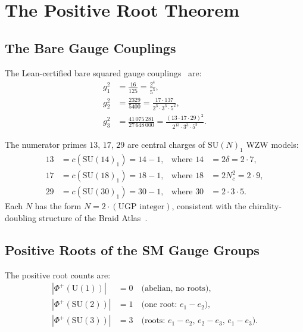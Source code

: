 \documentclass[11pt]{article}
\theoremstyle{remark}
\newcommand{\Nc}{N_c}
\newcommand{\ddelta}{\delta}
\newcommand{\PhiPlus}{\Phi^+}
\begin{document}
\section{The Positive Root Theorem}
\label{sec:posroots}

\subsection{The Bare Gauge Couplings}

The Lean-certified bare squared gauge couplings~\cite{Spivack2026_SM_UGP} are:
\begin{align}
  g_1^2 &= \tfrac{16}{125} = \tfrac{2^4}{5^3}, \label{eq:g1} \\[2pt]
  g_2^2 &= \tfrac{2329}{5400} = \tfrac{17 \cdot 137}{2^3 \cdot 3^3 \cdot 5^2}, \label{eq:g2} \\[2pt]
  g_3^2 &= \tfrac{41\,075\,281}{27\,648\,000}
         = \tfrac{(13 \cdot 17 \cdot 29)^2}{2^{13} \cdot 3^3 \cdot 5^3}. \label{eq:g3}
\end{align}

The numerator primes $13$, $17$, $29$ are central charges of $\mathrm{SU}(N)_1$ WZW models:
\begin{align*}
  13 &= c(\mathrm{SU}(14)_1) = 14 - 1, &\text{where } 14 &= 2\ddelta = 2 \cdot 7, \\
  17 &= c(\mathrm{SU}(18)_1) = 18 - 1, &\text{where } 18 &= 2\Nc^2 = 2 \cdot 9, \\
  29 &= c(\mathrm{SU}(30)_1) = 30 - 1, &\text{where } 30 &= 2 \cdot 3 \cdot 5.
\end{align*}
Each $N$ has the form $N = 2 \cdot (\text{UGP integer})$, consistent with the chirality-doubling
structure of the Braid Atlas~\cite{SpivackBraidAtlas}.

\subsection{Positive Roots of the SM Gauge Groups}

The positive root counts are:
\begin{align*}
  |\PhiPlus(\mathrm{U}(1))| &= 0 \quad \text{(abelian, no roots)}, \\
  |\PhiPlus(\mathrm{SU}(2))| &= 1 \quad \text{(one root: } e_1 - e_2\text{)}, \\
  |\PhiPlus(\mathrm{SU}(3))| &= 3 \quad \text{(roots: } e_1-e_2,\, e_2-e_3,\, e_1-e_3\text{)}.
\end{align*}
\end{document}
